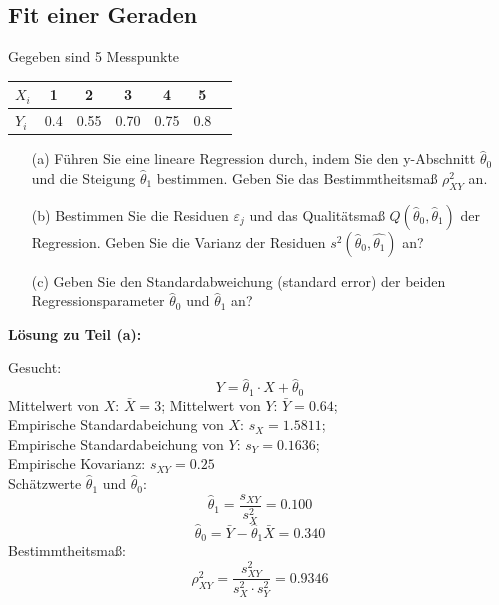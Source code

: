 \subsection{Fit einer Geraden}
Gegeben sind 5 Messpunkte
\begin{table}[htb!]
	\centering
	\begin{tabular}{l|c c c c c c}
		$X_i$ & 1 & 2 & 3 & 4 & 5 \\ \hline
		$Y_i$ & 0.4 & 0.55 & 0.70 & 0.75 & 0.8
	\end{tabular}
\end{table}
\begin{itemize}
	\item [(a)] Führen Sie eine lineare Regression durch, indem
	Sie den y-Abschnitt $\hat\theta_0$ und die Steigung $\hat\theta_1$ bestimmen. Geben Sie das Bestimmtheitsmaß $\rho_{XY}^2$ an.
	\item[(b)] Bestimmen Sie die Residuen $\varepsilon_j$ und das 
	Qualitätsmaß $Q(\hat\theta _0,\hat\theta _1)$ der Regression. Geben Sie die Varianz der Residuen 
	$s^2(\hat\theta_0,\hat{\theta_1})$ an?
	\item[(c)] Geben Sie den Standardabweichung (standard error) der beiden 
	Regressionsparameter $\hat\theta_0$ und $\hat\theta_1$ an?
	
\end{itemize}

\textbf{Lösung zu Teil (a):}

Gesucht: 
\[
Y = \hat\theta_1 \cdot X + \hat \theta_0 
\]
Mittelwert von $X$: $\bar{X} = 3$; Mittelwert von $Y$: $\bar{Y} = 0.64$; \\
Empirische Standardabeichung von $X$: $s_X = 1.5811$; \\
Empirische Standardabeichung von $Y$: $s_Y = 0.1636$; \\
Empirische Kovarianz: $s_{XY} = 0.25$ \\
Schätzwerte $\hat{\theta}_1$ und $\hat{\theta}_0$:
\[
\hat{\theta}_1 = \frac{s_{XY} }{s_X^2 } = 0.100
\]
\[
\hat{\theta}_0 = \bar {Y} - \hat{\theta}_1 \bar {X} = 0.340
\]
Bestimmtheitsmaß:
\[
\rho_{XY}^2 = \frac{s_{XY}^2 }{s_X^2 \cdot s_Y^2 } = 0.9346
\]

